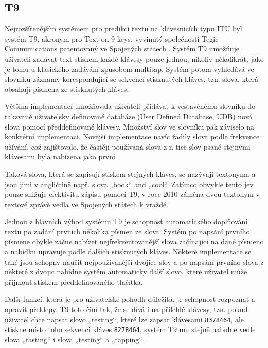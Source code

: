 \documentclass[a4paper,11pt]{article}
\newcommand{\td}[2][]{
	{\todo[size=\footnotesize]{#2}}
}
\begin{document}
\subsection{T9}

\td{overit, jen si nejsem jist jak..} Nejrozšířenějším systémem pro predikci textu na klávesnicích typu ITU byl systém T9, akronym pro Text on 9 keys, vyvinutý společností Tegic Communications \cite{Edq6tEyjOSzk54RQ} patentovaný ve Spojených státech \cite{Grover1998}. Systém T9 umožňuje uživateli zadávat text stiskem každé klávesy pouze jednou, nikoliv několikrát, jako je tomu u klasického zadávání způsobem multitap. Systém potom vyhledává ve slovníku záznamy korespondující se sekvencí stisknutých kláves, tzn. slova, která obsahují písmena ze stisknutých kláves. 

Většina implementací umožňovala uživateli přidávat k vestavěnému slovníku do takzvané uživatelsky definované databáze (User Defined Database, UDB) nová slova pomocí předdefinované klávesy. Množství slov ve slovníku pak záviselo na konkrétní implementaci. Novější implementace navíc řadily slova podle frekvence užívání, což zajištovalo, že častěji používaná slova z n-tice slov psané stejnými klávesami byla nabízena jako první. 

Taková slova, která se zapisují stiskem stejných kláves, se nazývají textonyma \cite{ZORN2007} a jsou jimi v angličtině např. slova „book“ and „cool“. Zatímco obvykle tento jev pouze snižuje efektivitu zápisu pomocí T9, v roce 2010 záměna dvou textonym v textové zprávě vedla ve Spojených státech k vraždě. \cite{bjjL0GPb5QxyO1A8} 

Jednou z hlavních výhod systému T9 je schopnost automatického doplňování textu po zadání prvních několika písmen ze slova. Systém po napsání prvního písmene obykle začne nabízet nejfrekventovanější slova začínající na dané písmeno a nabídku upravuje podle dalších stisknutých kláves. Některé implementace se také jsou schopny naučit nejpoužívanější dvojice slov a po napsání prvního slova z některé z dvojic nabídne systém automaticky další slovo, které uživatel může přijmout stiskem předdefinovaného tlačítka. \cite{hrzQ70bvKjUBgVml} 

Další funkcí, která je pro uživatelské pohodlí důležitá, je schopnost rozpoznat a opravit překlepy. T9 toto činí tak, že se dívá i na přilehlé klávesy, tzn. pokud uživatel chce napsat slovo „testing“, které lze zapsat klávesami {\tt 8378464}, ale stiskne místo toho sekvenci kláves {\tt 8278464}, systém T9 mu stejně nabídne vedle slova „tasting“ i slova „testing“ a „tapping“ \cite{hrzQ70bvKjUBgVml}.
\end{document}
